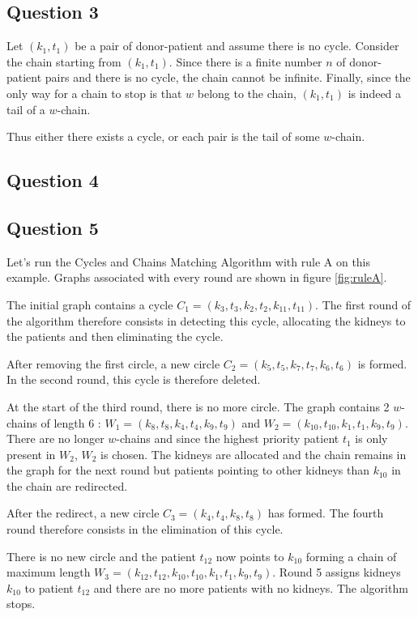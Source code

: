 \documentclass[english]{article}
\begin{document}
\subsection*{Question 3}

Let $(k_1,t_1)$ be a pair of donor-patient and assume there is no cycle. Consider the chain starting from $(k_1,t_1)$. Since there is a finite number $n$ of donor-patient pairs and there is no cycle, the chain cannot be infinite. Finally, since the only way for a chain to stop is that $w$ belong to the chain, $(k_1,t_1)$ is indeed a tail of a $w$-chain.

Thus either there exists a cycle, or each pair is the tail of some $w$-chain.

\subsection*{Question 4}

\subsection*{Question 5}

Let's run the Cycles and Chains Matching Algorithm with rule A on this example. Graphs associated with every round are shown in figure \ref{fig:ruleA}.

The initial graph contains a cycle $C_1 = (k_3, t_3, k_2, t_2, k_{11}, t_{11})$. The first round of the algorithm therefore consists in detecting this cycle, allocating the kidneys to the patients and then eliminating the cycle.

After removing the first circle, a new circle $C_2 = (k_5, t_5, k_7, t_7, k_6, t_6)$ is formed. In the second round, this cycle is therefore deleted.

At the start of the third round, there is no more circle. The graph contains 2 $w$-chains of length 6 : $W_1 = (k_8, t_8, k_4, t_4, k_9, t_9)$ and $W_2 = (k_{10}, t_{10}, k_1, t_1, k_9, t_9)$. There are no longer $w$-chains and since the highest priority patient $ t_1 $ is only present in $W_2$,  $W_2$ is chosen. The kidneys are allocated and the chain remains in the graph for the next round but patients pointing to other kidneys than $k_10$ in the chain are redirected.

After the redirect, a new circle $ C_3 = (k_4, t_4, k_8, t_8)$ has formed. The fourth round therefore consists in the elimination of this cycle.

There is no new circle and the patient $ t_{12} $ now points to $ k_{10} $ forming a chain of maximum length $ W_3 = (k_{12}, t_{12}, k_{10}, t_{10}, k_1, t_1, k_9, t_9) $. Round 5 assigns kidneys $ k_{10} $ to patient $ t_{12} $ and there are no more patients with no kidneys. The algorithm stops.
\end{document}
